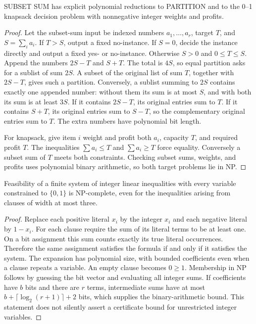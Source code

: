 \begin{theorem}\label{thm:N10}
SUBSET SUM has explicit polynomial reductions to PARTITION and to the
0--1 knapsack decision problem with nonnegative integer weights and profits.
\end{theorem}
\begin{proof}
Let the subset-sum input be indexed numbers $a_1,\ldots,a_r$, target $T$, and
$S=\sum_i a_i$. If $T>S$, output a fixed no-instance. If $S=0$, decide the
instance directly and output a fixed yes- or no-instance. Otherwise
$S>0$ and $0\le T\le S$. Append the numbers $2S-T$ and $S+T$. The total is
$4S$, so equal partition asks for a sublist of sum $2S$. A subset of the
original list of sum $T$, together with $2S-T$, gives such a partition.
Conversely, a sublist summing to $2S$ contains exactly one appended number:
without them its sum is at most $S$, and with both its sum is at least $3S$.
If it contains $2S-T$, its original entries sum to $T$. If it contains $S+T$,
its original entries sum to $S-T$, so the complementary original entries sum
to $T$. The extra numbers have polynomial bit length.

For knapsack, give item $i$ weight and profit both $a_i$, capacity $T$, and
required profit $T$. The inequalities $\sum a_i\le T$ and $\sum a_i\ge T$
force equality. Conversely a subset sum of $T$ meets both constraints.
Checking subset sums, weights, and profits uses polynomial binary arithmetic,
so both target problems lie in NP.
\end{proof}

\begin{theorem}\label{thm:N11}
Feasibility of a finite system of integer linear inequalities with every
variable constrained to $\{0,1\}$ is NP-complete, even for the inequalities
arising from clauses of width at most three.
\end{theorem}
\begin{proof}
Replace each positive literal $x_i$ by the integer $x_i$ and each negative
literal by $1-x_i$. For each clause require the sum of its literal terms to
be at least one. On a bit assignment this sum counts exactly its true literal
occurrences. Therefore the same assignment satisfies the formula if and only
if it satisfies the system. The expansion has polynomial size, with bounded
coefficients even when a clause repeats a variable. An empty clause becomes
$0\ge1$. Membership in NP follows by guessing the bit vector and evaluating
all integer sums. If coefficients have $b$ bits and there are $r$ terms,
intermediate sums have at most $b+\lceil\log_2(r+1)\rceil+2$ bits, which
supplies the binary-arithmetic bound. This statement does not silently assert
a certificate bound for unrestricted integer variables.
\end{proof}

